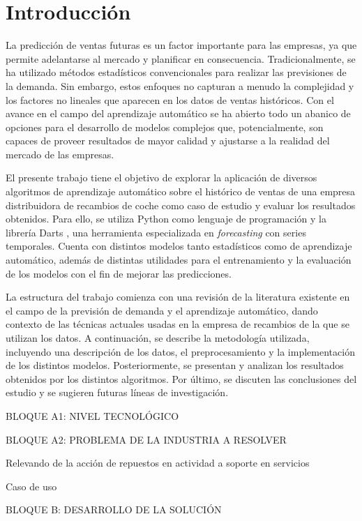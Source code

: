 \chapter{Introducción}\label{cap1}

La predicción de ventas futuras es un factor importante para las empresas, ya que permite adelantarse al mercado y planificar en consecuencia. Tradicionalmente, se ha utilizado métodos estadísticos convencionales para realizar las previsiones de la demanda. Sin embargo, estos enfoques no capturan a menudo la complejidad y los factores no lineales que aparecen en los datos de ventas históricos. Con el avance en el campo del aprendizaje automático se ha abierto todo un abanico de opciones para el desarrollo de modelos complejos que, potencialmente, son capaces de proveer resultados de mayor calidad y ajustarse a la realidad del mercado de las empresas.

El presente trabajo tiene el objetivo de explorar la aplicación de diversos algoritmos de aprendizaje automático sobre el histórico de ventas de una empresa distribuidora de recambios de coche como caso de estudio y evaluar los resultados obtenidos. Para ello, se utiliza Python \cite*{python} como lenguaje de programación y la librería Darts \cite*{darts}, una herramienta especializada en \textit{forecasting} con series temporales. Cuenta con distintos modelos tanto estadísticos como de aprendizaje automático, además de distintas utilidades para el entrenamiento y la evaluación de los modelos con el fin de mejorar las predicciones.

La estructura del trabajo comienza con una revisión de la literatura existente en el campo de la previsión de demanda y el aprendizaje automático, dando contexto de las técnicas actuales usadas en la empresa de recambios de la que se utilizan los datos. A continuación, se describe la metodología utilizada, incluyendo una descripción de los datos, el preprocesamiento y la implementación de los distintos modelos. Posteriormente, se presentan y analizan los resultados obtenidos por los distintos algoritmos. Por último, se discuten las conclusiones del estudio y se sugieren futuras líneas de investigación.


BLOQUE A1: NIVEL TECNOLÓGICO

BLOQUE A2: PROBLEMA DE LA INDUSTRIA A RESOLVER

Relevando de la acción de repuestos en actividad a soporte en servicios

Caso de uso

BLOQUE B: DESARROLLO DE LA SOLUCIÓN

